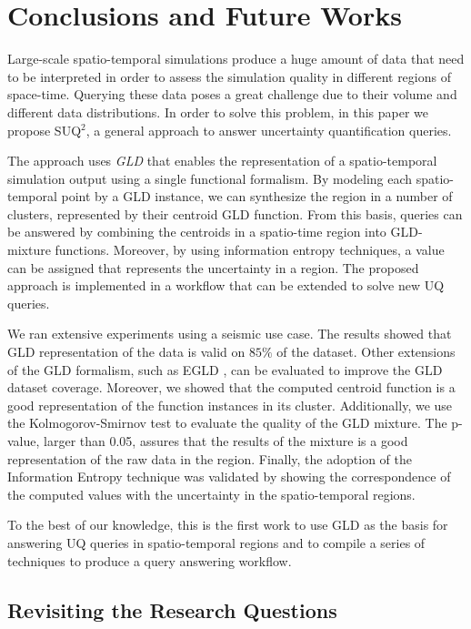 \chapter[Conclusions and Future Works]{Conclusions and Future Works}\label{cap:conclusions}
Large-scale spatio-temporal simulations produce a huge amount of data that need to be interpreted in order to assess the simulation quality in different regions of space-time. Querying these data poses a great challenge due to their volume and different data distributions. In order to solve this problem, 
in this paper we propose SUQ$^2$, a general approach to answer uncertainty quantification queries. 

The approach uses \textit{GLD} that enables the representation of a spatio-temporal simulation output using a single functional formalism. By modeling each spatio-temporal point by a GLD instance, we can synthesize the region in a number of clusters, represented by their centroid GLD function. From this basis, queries can be answered by combining the centroids in a spatio-time region into GLD-mixture functions. Moreover, by using information entropy techniques, a value can be assigned that represents the uncertainty in a region. The proposed approach is implemented in a workflow that can be extended to solve new UQ queries.

We ran extensive experiments using a seismic use case. The results showed that GLD representation of the data is valid on $85 \%$ of the dataset. Other extensions of the GLD formalism, such as EGLD \cite{Karian2011}, can be evaluated to improve the GLD dataset coverage. Moreover, we showed that the computed centroid function is a good representation of the function instances in its cluster. Additionally, we use the Kolmogorov-Smirnov test to evaluate the quality of the GLD mixture. The p-value, larger than 0.05, assures that the results of the mixture is a good representation of the raw data in the region. Finally, the adoption of the Information Entropy technique was validated by showing the correspondence of the computed values with the uncertainty in the spatio-temporal regions. 

To the best of our knowledge, this is the first work to use GLD as the basis for answering UQ queries in spatio-temporal regions and to compile a series of techniques to produce a query answering workflow.

\section{Revisiting the Research Questions}

